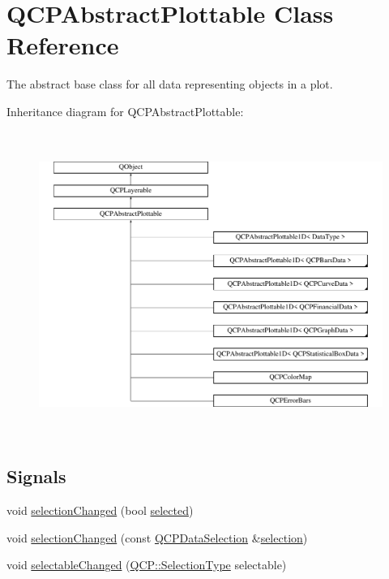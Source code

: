 \hypertarget{class_q_c_p_abstract_plottable}{}\section{Q\+C\+P\+Abstract\+Plottable Class Reference}
\label{class_q_c_p_abstract_plottable}


The abstract base class for all data representing objects in a plot.  


Inheritance diagram for Q\+C\+P\+Abstract\+Plottable\+:\begin{figure}[H]
\begin{center}
\leavevmode
\includegraphics[height=9.967637cm]{class_q_c_p_abstract_plottable}
\end{center}
\end{figure}
\subsection*{Signals}
\begin{DoxyCompactItemize}
\item 
void \hyperlink{class_q_c_p_abstract_plottable_a3af66432b1dca93b28e00e78a8c7c1d9}{selection\+Changed} (bool \hyperlink{class_q_c_p_abstract_plottable_a0b3b514474fe93354fc74cfc144184b4}{selected})
\item 
void \hyperlink{class_q_c_p_abstract_plottable_a787a9c39421059006891744b731fa473}{selection\+Changed} (const \hyperlink{class_q_c_p_data_selection}{Q\+C\+P\+Data\+Selection} \&\hyperlink{class_q_c_p_abstract_plottable_a040bf09f41d456284cfd39cc37aa068f}{selection})
\item 
void \hyperlink{class_q_c_p_abstract_plottable_a663b1a44123c8340ac041a29d1e2c973}{selectable\+Changed} (\hyperlink{namespace_q_c_p_ac6cb9db26a564b27feda362a438db038}{Q\+C\+P\+::\+Selection\+Type} selectable)
\end{DoxyCompactItemize}
